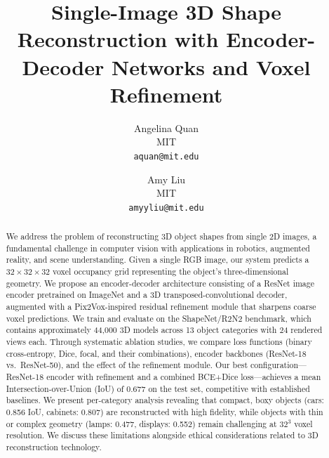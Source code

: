 \documentclass[10pt,twocolumn,letterpaper]{article}
\begin{document}
\title{Single-Image 3D Shape Reconstruction with Encoder-Decoder Networks and Voxel Refinement}

\author{
Angelina Quan\\
MIT\\
{\tt\small aquan@mit.edu}
\and
Amy Liu\\
MIT\\
{\tt\small amyyliu@mit.edu}
}

\maketitle

\begin{abstract}

We address the problem of reconstructing 3D object shapes from single 2D images, a fundamental challenge in computer vision with applications in robotics, augmented reality, and scene understanding. Given a single RGB image, our system predicts a $32 \times 32 \times 32$ voxel occupancy grid representing the object's three-dimensional geometry. We propose an encoder-decoder architecture consisting of a ResNet image encoder pretrained on ImageNet and a 3D transposed-convolutional decoder, augmented with a Pix2Vox-inspired residual refinement module that sharpens coarse voxel predictions. We train and evaluate on the ShapeNet/R2N2 benchmark, which contains approximately 44,000 3D models across 13 object categories with 24 rendered views each. Through systematic ablation studies, we compare loss functions (binary cross-entropy, Dice, focal, and their combinations), encoder backbones (ResNet-18 vs.\ ResNet-50), and the effect of the refinement module. Our best configuration---ResNet-18 encoder with refinement and a combined BCE+Dice loss---achieves a mean Intersection-over-Union (IoU) of 0.677 on the test set, competitive with established baselines. We present per-category analysis revealing that compact, boxy objects (cars: 0.856 IoU, cabinets: 0.807) are reconstructed with high fidelity, while objects with thin or complex geometry (lamps: 0.477, displays: 0.552) remain challenging at $32^3$ voxel resolution. We discuss these limitations alongside ethical considerations related to 3D reconstruction technology.

\end{abstract}

\end{document}
